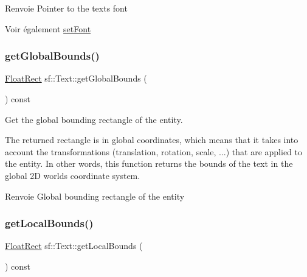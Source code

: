 \begin{DoxyReturn}{Renvoie}
Pointer to the text\textquotesingle{}s font
\end{DoxyReturn}
\begin{DoxySeeAlso}{Voir également}
\hyperlink{classsf_1_1Text_a2927805d1ae92d57f15034ea34756b81}{set\+Font} 
\end{DoxySeeAlso}
\mbox{\label{classsf_1_1Text_ad33ed96ce9fbe99610f7f8b6874a16b4}} 
\subsubsection{\texorpdfstring{get\+Global\+Bounds()}{getGlobalBounds()}}
{\footnotesize\ttfamily \hyperlink{classsf_1_1Rect}{Float\+Rect} sf\+::\+Text\+::get\+Global\+Bounds (\begin{DoxyParamCaption}{ }\end{DoxyParamCaption}) const}



Get the global bounding rectangle of the entity. 

The returned rectangle is in global coordinates, which means that it takes into account the transformations (translation, rotation, scale, ...) that are applied to the entity. In other words, this function returns the bounds of the text in the global 2D world\textquotesingle{}s coordinate system.

\begin{DoxyReturn}{Renvoie}
Global bounding rectangle of the entity 
\end{DoxyReturn}
\mbox{\label{classsf_1_1Text_a3e6b3b298827f853b41165eee2cbbc66}} 
\subsubsection{\texorpdfstring{get\+Local\+Bounds()}{getLocalBounds()}}
{\footnotesize\ttfamily \hyperlink{classsf_1_1Rect}{Float\+Rect} sf\+::\+Text\+::get\+Local\+Bounds (\begin{DoxyParamCaption}{ }\end{DoxyParamCaption}) const}



